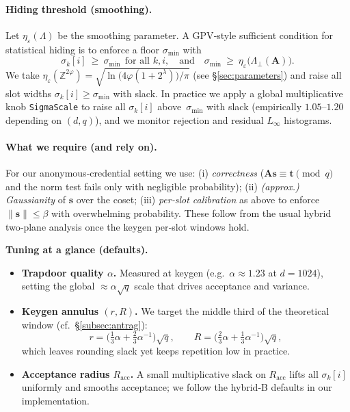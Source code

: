 \paragraph{Hiding threshold (smoothing).}
Let $\eta_\varepsilon(\Lambda)$ be the smoothing parameter. A GPV‑style sufficient condition for statistical hiding is to enforce a floor $\sigma_{\min}$ with
\[
  \sigma_k[i]\ \ge\ \sigma_{\min}\ \ \text{for all $k,i$},\quad \text{and}\quad \sigma_{\min}\ \ge\ \eta_\varepsilon\!\big(\Lambda_{\perp}(\mathbf{A})\big).
\]
We take $\eta_\varepsilon(\mathbb{Z}^{2\varphi})=\sqrt{\ln\!\bigl(4\varphi(1+2^{\lambda})\bigr)/\pi}$ (see \S\ref{sec:parameters}) and raise all slot widths $\sigma_k[i]\ge \sigma_{\min}$ with slack.
In practice we apply a global multiplicative knob \texttt{SigmaScale} to raise all $\sigma_k[i]$ above~$\sigma_{\min}$ with slack (empirically $1.05$–$1.20$ depending on $(d,q)$), and we monitor rejection and residual $L_\infty$ histograms.

\paragraph{What we require (and rely on).}
For our anonymous‑credential setting we use: (i) \emph{correctness} ($\mathbf{A}\mathbf{s}\equiv \mathbf{t}\pmod q$ and the norm test fails only with negligible probability); (ii) \emph{(approx.) Gaussianity} of $\mathbf{s}$ over the coset; (iii) \emph{per‑slot calibration} as above to enforce $\|\mathbf{s}\|\le\beta$ with overwhelming probability. These follow from the usual hybrid two‑plane analysis once the keygen per‑slot windows hold.

\vspace{0.6em}
\noindent\textbf{Tuning at a glance (defaults).}
\begin{itemize}[leftmargin=1.25em]
  \item \textbf{Trapdoor quality $\alpha$.} Measured at keygen (e.g.\ $\alpha\approx 1.23$ at $d=1024$), setting the global $\approx \alpha\sqrt{q}$ scale that drives acceptance and variance.
  \item \textbf{Keygen annulus $(r,R)$.} We target the middle third of the theoretical window (cf.\ \S\ref{subsec:antrag}):
  \[
    r=\Big(\tfrac{1}{3}\alpha+\tfrac{2}{3}\alpha^{-1}\Big)\sqrt{q},\qquad
    R=\Big(\tfrac{2}{3}\alpha+\tfrac{1}{3}\alpha^{-1}\Big)\sqrt{q},
  \]
  which leaves rounding slack yet keeps repetition low in practice.
  \item \textbf{Acceptance radius $R_{\mathrm{acc}}$.} A small multiplicative slack on $R_{\mathrm{acc}}$ lifts all $\sigma_k[i]$ uniformly and smooths acceptance; we follow the hybrid‑B defaults in our implementation.
\end{itemize}

